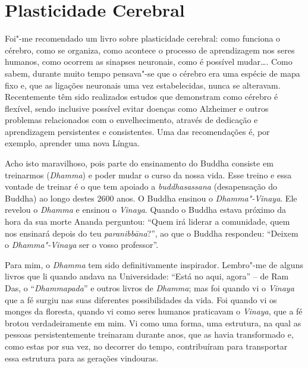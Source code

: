 \chapter{Plasticidade Cerebral}

Foi"-me recomendado um livro sobre plasticidade cerebral: como funciona o
cérebro, como se organiza, como acontece o processo de aprendizagem nos
seres humanos, como ocorrem as sinapses neuronais, como é possível
mudar\ldots{}. Como sabem, durante muito tempo pensava"-se que o cérebro
era uma espécie de mapa fixo e, que as ligações neuronais uma vez
estabelecidas, nunca se alteravam. Recentemente têm sido realizados
estudos que demonstram como cérebro é flexível, sendo inclusive possível
evitar doenças como Alzheimer e outros problemas relacionados com o
envelhecimento, através de dedicação e aprendizagem persistentes e
consistentes. Uma das recomendações é, por exemplo, aprender uma nova
Língua.

Acho isto maravilhoso, pois parte do ensinamento do Buddha consiste em
treinarmos (\emph{Dhamma}) e poder mudar o curso da nossa vida. Esse
treino e essa vontade de treinar é o que tem apoiado a
\emph{buddhasassana} (desapensação do Buddha) ao longo destes 2600 anos.
O Buddha ensinou o \emph{Dhamma"-Vinaya}. Ele revelou o \emph{Dhamma} e
ensinou o \emph{Vinaya}. Quando o Buddha estava próximo da hora da sua
morte Ananda perguntou: ``Quem irá liderar a comunidade, quem nos
ensinará depois do teu \emph{paranibbāna}?'', ao que o Buddha respondeu:
``Deixem o \emph{Dhamma"-Vinaya} ser o vosso professor''.

Para mim, o \emph{Dhamma} tem sido definitivamente inspirador. Lembro"-me
de alguns livros que li quando andava na Universidade: ``Está no aqui,
agora'' -- de Ram Das, o ``\emph{Dhammapada}'' e outros livros de
\emph{Dhamma}; mas foi quando vi o \emph{Vinaya} que a fé surgiu nas
suas diferentes possibilidades da vida. Foi quando vi os monges da
floresta, quando vi como seres humanos praticavam o \emph{Vinaya}, que a
fé brotou verdadeiramente em mim. Vi como uma forma, uma estrutura, na
qual as pessoas persistentemente treinaram durante anos, que as havia
transformado e, como estas por sua vez, no decorrer do tempo,
contribuíram para transportar essa estrutura para as gerações vindouras.

